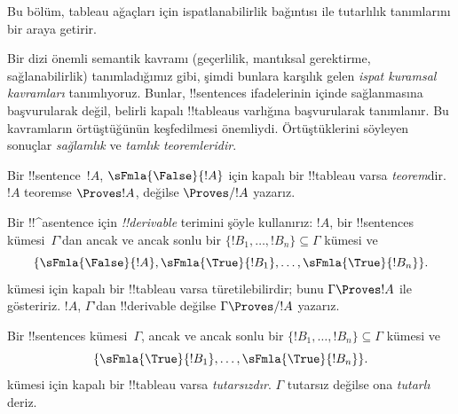 

      {}
      {}
      

\begin{editorial}
Bu bölüm, tableau ağaçları için ispatlanabilirlik bağıntısı ile tutarlılık
tanımlarını bir araya getirir.
\end{editorial}

\begin{explain}
Bir dizi önemli semantik kavramı (geçerlilik, mantıksal gerektirme,
sağlanabilirlik) tanımladığımız gibi, şimdi bunlara karşılık gelen
\emph{ispat kuramsal kavramları} tanımlıyoruz. Bunlar, !!{sentence}s
ifadelerinin  içinde sağlanmasına başvurularak değil, belirli
kapalı !!{tableau}s varlığına başvurularak tanımlanır. Bu kavramların
örtüştüğünün keşfedilmesi önemliydi. Örtüştüklerini söyleyen sonuçlar
\emph{sağlamlık} ve \emph{tamlık teoremleridir}.
\end{explain}


\begin{defn}[Teoremler]
Bir !!{sentence}~$!A$, $\sFmla{\False}{!A}$ için kapalı bir !!{tableau}
varsa \emph{teorem}dir. $!A$ teoremse $\Proves !A$, değilse $\Proves/ !A$
yazarız.
\end{defn}

\begin{defn}[!!^{derivability}]
Bir !!^a{sentence} için \emph{!!{derivable}} terimini şöyle kullanırız:
$!A$, bir !!{sentence}s kümesi~$\Gamma$'dan ancak ve ancak sonlu bir
$\{!B_1, \dots, !B_n\} \subseteq \Gamma$ kümesi ve
\[
\{
  \sFmla{\False}{!A},
  \sFmla{\True}{!B_1}, \dots,
  \sFmla{\True}{!B_n}
  \}.
\]
kümesi için kapalı bir !!{tableau} varsa türetilebilirdir; bunu
$\Gamma \Proves !A$ ile gösteririz. $!A$, $\Gamma$'dan !!{derivable}
değilse $\Gamma \Proves/ !A$ yazarız.
\end{defn}

\begin{defn}[Tutarlılık]
Bir !!{sentence}s kümesi~$\Gamma$, ancak ve ancak sonlu bir
$\{!B_1, \dots, !B_n\} \subseteq \Gamma$ kümesi ve
\[
\{
  \sFmla{\True}{!B_1}, \dots,
  \sFmla{\True}{!B_n}  
  \}.
\]
kümesi için kapalı bir !!{tableau} varsa \emph{tutarsızdır}. $\Gamma$
tutarsız değilse ona \emph{tutarlı} deriz.
\end{defn}

